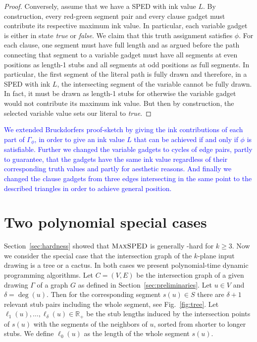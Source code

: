 \documentclass[a4paper,english,numberwithinsect]{eurocg18}
\newcommand{\maxsped}{\ensuremath{\textsc{MaxSPED}}\xspace}
\begin{document}
\begin{proof}
	Conversely, assume that we have a SPED with ink value $L$. 
	By construction, every red-green segment pair and every clause gadget must contribute its respective maximum ink value.
	In particular, each variable gadget is either in state \emph{true} or \emph{false}.
	We claim that this truth assignment satisfies $\phi$.
	For each clause, one segment must have full length and as argued before the path connecting that segment to a variable gadget must have all segments at even positions as length-1 stubs and all segments at odd positions as full segments. 
	In particular, the first segment of the literal path is fully drawn and therefore, in a SPED with ink $L$, the intersecting segment of the variable cannot be fully drawn.
	In fact, it must be drawn as length-1 stubs for otherwise the variable gadget would not contribute its maximum ink value.
	But then by construction, the selected variable value sets our literal to \emph{true}.	
\end{proof}

\textcolor{blue}{We extended Bruckdorfers proof-sketch by giving the ink contributions of each part of $\Gamma_\phi$, in order to give an ink value $L$ that can be achieved if and only if $\phi$ is satisfiable. Further we changed the variable gadgets to cycles of edge pairs, partly to guarantee, that the gadgets have the same ink value regardless of their corresponding truth values and partly for aesthetic reasons. And finally we changed the clause gadgets from three edges intersecting in the same point to the described triangles in order to achieve general position.}

\section{Two polynomial special cases}


Section~\ref{sec:hardness} showed that \maxsped is generally \NP-hard for $k \ge 3$. 
Now we consider the special case that the intersection graph of the $k$-plane input drawing is a tree or a cactus. In both cases we present polynomial-time dynamic programming algorithms. Let $ C = (V,E) $ be the intersection graph of a given drawing $\Gamma$ of a graph $ G $ as defined in Section~\ref{sec:preliminaries}. 
Let $ u \in V $ and $ \delta  = \deg(u) $. 
Then for the corresponding segment $ s(u) \in S $ there are $ \delta + 1 $ relevant stub pairs including the whole segment, see Fig.~\ref{fig:tree}. 
Let $ \ell_1(u), \dots, \ell_\delta(u) \in \mathbb{R}_+$ be the stub lengths induced by the intersection points of $s(u)$ with the segments of the neighbors of $u$,  sorted from shorter to longer stubs. We define  $ \ell_0(u) $ as the length of the whole segment $ s(u) $. 
\end{document}
